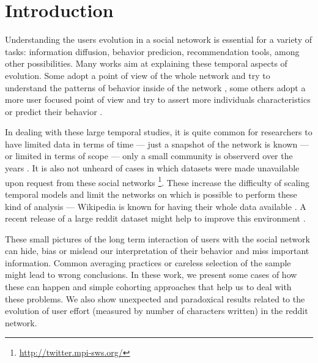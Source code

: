 \section{Introduction}


Understanding the users evolution in a social netowork is essential for a variety of tasks: information diffusion, behavior predicion, recommendation tools, among other possibilities. Many works aim at explaining these temporal aspects of evolution. Some adopt a point of view of the whole network and try to understand the patterns of behavior inside of the network \cite{Zhu2014, Kooti2010}, some others adopt a more user focused point of view and try to assert more individuals characteristics \cite{Correa2010, Priedhorsky2007, Panciera2009} or predict their behavior \cite{Danescu-niculescu-mizil2013}.

In dealing with these large temporal studies, it is quite common for researchers to have limited data in terms of time --- just a snapshot of the network is known \cite{} --- or limited in terms of scope --- only a small community is observerd over the years \cite{Lewis2008}. It is also not unheard of cases in which datasets were made unavailable upon request from these social networks \footnote{\url{http://twitter.mpi-sws.org/}}. These increase the difficulty of scaling temporal models and limit the networks on which is possible to perform these kind of analysis --- Wikipedia is known for having their whole data available \cite{Panciera2009, Priedhorsky2007}. A recent release of a large reddit dataset might help to improve this environment \cite{}.

These small pictures of the long term interaction of users with the social network can hide, bias or mislead our interpretation of their behavior and miss important information. Common averaging practices or careless selection of the sample might lead to wrong conclusions. In these work, we present some cases of how these can happen and simple cohorting approaches that help us to deal with these problems. We also show unexpected and paradoxical results related to the evolution of user effort (measured by number of characters written) in the reddit network.